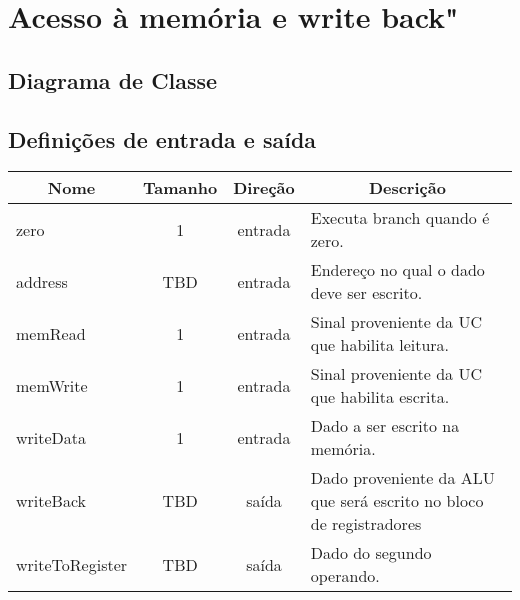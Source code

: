 \section{Acesso à memória e write back"}
	\subsection{Diagrama de Classe}
  \begin{figure}[H]
    
  \end{figure}

\subsection{Definições de entrada e saída}

	\begin{center}
        \begin{longtable}[pos]{| l | c | c | m{7cm} |} \hline
          \multicolumn{1}{|c|}{\cellcolor[gray]{0.9}\textbf{Nome}} & 
          \multicolumn{1}{c|}{\cellcolor[gray]{0.9}\textbf{Tamanho}} & 
          \multicolumn{1}{c|}{\cellcolor[gray]{0.9}\textbf{Direção}} &
          \multicolumn{1}{c|}{\cellcolor[gray]{0.9}\textbf{Descrição}} \\ \hline
          \endhead
          \hline
          \endlastfoot

          zero          	       & 1   & entrada   & Executa branch quando é zero.    \\ \hline
          address                  & TBD & entrada   & Endereço no qual o dado deve ser escrito.    \\ \hline
          memRead                  & 1   & entrada   & Sinal proveniente da UC que habilita leitura.    \\ \hline
          memWrite                 & 1   & entrada   & Sinal proveniente da UC que habilita escrita.    \\ \hline
          writeData      		   & 1   & entrada   & Dado a ser escrito na memória. \\ \hline
          writeBack	               & TBD & saída     & Dado proveniente da ALU que será escrito no bloco de registradores\\ \hline
          writeToRegister          & TBD & saída     & Dado do segundo operando.    \\
        \end{longtable}
      \end{center}